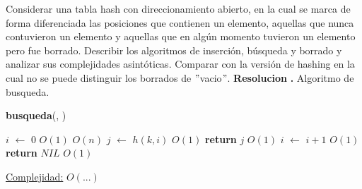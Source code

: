 \documentclass[10pt,a4paper]{article}
\begin{document}
Considerar una tabla hash con direccionamiento abierto, en la cual se marca de forma diferenciada las posiciones que contienen un elemento, aquellas que nunca contuvieron un elemento y aquellas que en algún momento tuvieron un elemento pero fue borrado. Describir los algoritmos de inserción, búsqueda y borrado y analizar sus complejidades asintóticas. Comparar con la versión de hashing en la cual no se puede distinguir los borrados de $"$vacio$"$.
\newline
\newline
\textbf{Resolucion}
\newline
\newline
\textbf{.} Algoritmo de busqueda.

\begin{algorithm}[H]{\textbf{busqueda}(, )}
	\begin{algorithmic}[1]
		\State $i$ $\gets$ 0             				     \Comment $O(1)$
		 	     \Comment $O(n)$
		\State $j$ $\gets$ $h(k,i)$                        \Comment $O(1)$
		\State \textbf{return} $j$             			 \Comment $O(1)$
		\EndIf
		\State $i$ $\gets$ $i+1$                              \Comment $O(1)$
		\EndWhile
		\State \textbf{return} $NIL$                              \Comment $O(1)$
		
		\medskip
		\Statex \underline{Complejidad:} $O(...)$
	\end{algorithmic}
\end{algorithm}
\end{document}
